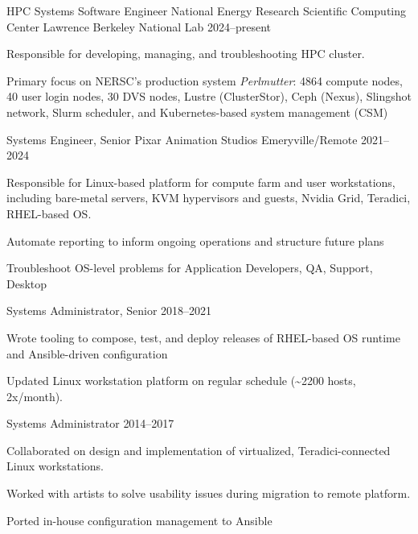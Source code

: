 

  \cventry
  {HPC Systems Software Engineer}
  {National Energy Research Scientific Computing Center}
  {Lawrence Berkeley National Lab}
  {2024--present}
  {
    \begin{cvitems}
    \item{
      Responsible for developing, managing, and troubleshooting HPC cluster.
    }
    \item{
      Primary focus on NERSC's production system \textit{Perlmutter}:
      4864 compute nodes, 40 user login nodes, 30 DVS nodes, Lustre (ClusterStor), Ceph (Nexus), Slingshot network, Slurm scheduler, and Kubernetes-based system management (CSM)
    }
    \end{cvitems}
  }

  \cventry
  {Systems Engineer, Senior}  %
  {Pixar Animation Studios}  %
  {Emeryville/Remote}  %
  {2021--2024}  %
  {
    \begin{cvitems}  %
    \item{
      Responsible for Linux-based platform for compute farm and user workstations,
      including bare-metal servers, KVM hypervisors and guests, Nvidia Grid, Teradici, RHEL-based OS.
    }
    \item{Automate reporting to inform ongoing operations and structure future plans}
    \item{Troubleshoot OS-level problems for Application Developers, QA, Support, Desktop}
    \end{cvitems}
  }

  \cventry
  {Systems Administrator, Senior}  %
  {}
  {}
  {2018--2021}  %
  {
    \begin{cvitems}  %
    \item {Wrote tooling to compose, test, and deploy releases of RHEL-based OS runtime and Ansible-driven configuration}
    \item {Updated Linux workstation platform on regular schedule (\textasciitilde{}2200 hosts, 2x/month).}
    \end{cvitems}
  }

  \cventry
  {Systems Administrator}
  {}
  {}
  {2014--2017}
  {
    \begin{cvitems}
    \item {Collaborated on design and implementation of virtualized, Teradici-connected Linux workstations.}
    \item {Worked with artists to solve usability issues during migration to remote platform.}
    \item {Ported in-house configuration management to Ansible}
    \end{cvitems}
  }

